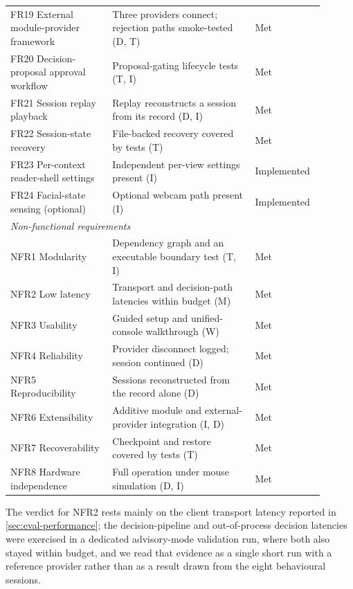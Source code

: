 \begin{longtable}{p{0.30\linewidth} p{0.42\linewidth} p{0.18\linewidth}}
FR19 External module-provider framework & Three providers connect; rejection paths smoke-tested (D, T) & Met \\
FR20 Decision-proposal approval workflow & Proposal-gating lifecycle tests (T, I) & Met \\
FR21 Session replay playback            & Replay reconstructs a session from its record (D, I) & Met \\
FR22 Session-state recovery             & File-backed recovery covered by tests (T) & Met \\
FR23 Per-context reader-shell settings  & Independent per-view settings present (I) & Implemented \\
FR24 Facial-state sensing (optional)    & Optional webcam path present (I) & Implemented \\
\midrule
\multicolumn{3}{l}{\textit{Non-functional requirements}} \\
\midrule
NFR1 Modularity            & Dependency graph and an executable boundary test (T, I) & Met \\
NFR2 Low latency           & Transport and decision-path latencies within budget (M) & Met \\
NFR3 Usability             & Guided setup and unified-console walkthrough (W) & Met \\
NFR4 Reliability           & Provider disconnect logged; session continued (D) & Met \\
NFR5 Reproducibility       & Sessions reconstructed from the record alone (D) & Met \\
NFR6 Extensibility         & Additive module and external-provider integration (I, D) & Met \\
NFR7 Recoverability        & Checkpoint and restore covered by tests (T) & Met \\
NFR8 Hardware independence  & Full operation under mouse simulation (D, I) & Met \\
\end{longtable}
\endgroup

The verdict for NFR2 rests mainly on the client transport latency reported in \cref{sec:eval-performance}; the decision-pipeline and out-of-process decision latencies were exercised in a dedicated advisory-mode validation run, where both also stayed within budget, and we read that evidence as a single short run with a reference provider rather than as a result drawn from the eight behavioural sessions.
